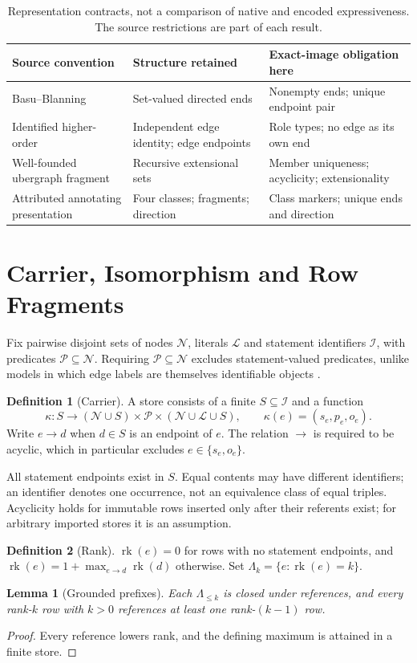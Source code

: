 \documentclass[11pt]{article}
\theoremstyle{plain}
\newtheorem{lemma}[theorem]{Lemma}
\theoremstyle{definition}
\newtheorem{definition}{Definition}
\theoremstyle{remark}
\newcommand{\Stmt}{\mathcal I}
\newcommand{\Node}{\mathcal N}
\newcommand{\Lit}{\mathcal L}
\newcommand{\Pred}{\mathcal P}
\newcommand{\rk}{\operatorname{rk}}
\begin{document}
\begin{table}[t]
\centering\small
\begin{tabular}{L{3.2cm}L{4.4cm}L{5.4cm}}
\toprule
Source convention & Structure retained & Exact-image obligation here\\
\midrule
Basu--Blanning & Set-valued directed ends & Nonempty ends; unique endpoint pair\\
Identified higher-order & Independent edge identity; edge endpoints & Role types; no edge as its own end\\
Well-founded ubergraph fragment & Recursive extensional sets & Member uniqueness; acyclicity; extensionality\\
Attributed annotating presentation & Four classes; fragments; direction & Class markers; unique ends and direction\\
\bottomrule
\end{tabular}
\caption{Representation contracts, not a comparison of native and encoded
expressiveness. The source restrictions are part of each result.}
\label{tab:compare}
\end{table}

\section{Carrier, Isomorphism and Row Fragments}\label{sec:carrier}
Fix pairwise disjoint sets of nodes $\Node$, literals $\Lit$ and statement identifiers
$\Stmt$, with predicates $\Pred\subseteq\Node$. Requiring $\Pred\subseteq\Node$ excludes
statement-valued predicates, unlike models in which edge labels are themselves
identifiable objects \cite{sadoughi2024metaproperty}.
\begin{definition}[Carrier]
A store consists of a finite $S\subseteq\Stmt$ and a function
\[
\kappa:S\longrightarrow(\Node\cup S)\times\Pred\times(\Node\cup\Lit\cup S),
\qquad \kappa(e)=(s_e,p_e,o_e).
\]
Write $e\to d$ when $d\in S$ is an endpoint of $e$. The relation $\to$ is required to
be acyclic, which in particular excludes $e\in\{s_e,o_e\}$.
\end{definition}
All statement endpoints exist in $S$. Equal contents may have different identifiers; an
identifier denotes one occurrence, not an equivalence class of equal triples. Acyclicity
holds for immutable rows inserted only after their referents exist; for arbitrary
imported stores it is an assumption.

\begin{definition}[Rank]
$\rk(e)=0$ for rows with no statement endpoints, and
$\rk(e)=1+\max_{e\to d}\rk(d)$ otherwise. Set $\Lambda_k=\{e:\rk(e)=k\}$.
\end{definition}
\begin{lemma}[Grounded prefixes]\label{lem:prefix}
Each $\Lambda_{\le k}$ is closed under references, and every rank-$k$ row with $k>0$
references at least one rank-$(k-1)$ row.
\end{lemma}
\begin{proof}
Every reference lowers rank, and the defining maximum is attained in a finite store.
\end{proof}
\end{document}
